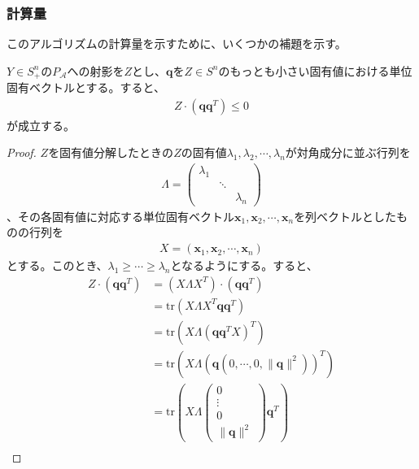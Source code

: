 \subsubsection{計算量}
このアルゴリズムの計算量を示すために、いくつかの補題を示す。
\begin{lemma} \label{NegativeInnerProduct}
  $Y \in S_+^n$の$P_\mathcal{A}$への射影を$Z$とし、$\mathbf{q}$を$Z \in S^n$のもっとも小さい固有値における単位固有ベクトルとする。すると、
  \begin{align*}
    Z \cdot \left(\mathbf{q} \mathbf{q}^T\right) \leq 0
  \end{align*}
  が成立する。
\end{lemma}
\begin{proof}
  $Z$を固有値分解したときの$Z$の固有値$\lambda_1, \lambda_2, \cdots, \lambda_n$が対角成分に並ぶ行列を
  \begin{align*}
    \Lambda = \left(
                \begin{array}{ccc}
                  \lambda_1 &        & \\
                            & \ddots & \\
                            &        & \lambda_n
                \end{array}
              \right)
  \end{align*}
  、その各固有値に対応する単位固有ベクトル$\mathbf{x}_1, \mathbf{x}_2, \cdots, \mathbf{x}_n$を列ベクトルとしたものの行列を
  \begin{align*}
    X = \left(\mathbf{x}_1, \mathbf{x}_2, \cdots, \mathbf{x}_n\right)
  \end{align*}
  とする。このとき、$\lambda_1 \geq \cdots \geq \lambda_n$となるようにする。すると、
  \begin{align*}
    Z \cdot \left(\mathbf{q} \mathbf{q}^T\right) & = \left(X \Lambda X^T\right) \cdot \left(\mathbf{q} \mathbf{q}^T\right) \\
                                                 & = \mathrm{tr}\left(X \Lambda X^T \mathbf{q} \mathbf{q}^T\right) \\
                                                 & = \mathrm{tr}\left(X \Lambda \left(\mathbf{q} \mathbf{q}^T X\right)^T\right) \\
                                                 & = \mathrm{tr}\left(X \Lambda \left(\mathbf{q} \left(0, \cdots, 0, \|\mathbf{q}\|^2\right)\right)^T\right) \\
                                                 & = \mathrm{tr}\left(X \Lambda \left(\begin{array}{c} 0 \\ \vdots \\ 0 \\ \|\mathbf{q}\|^2 \end{array}\right) \mathbf{q}^T\right) \\

\end{align*}
\end{proof}
